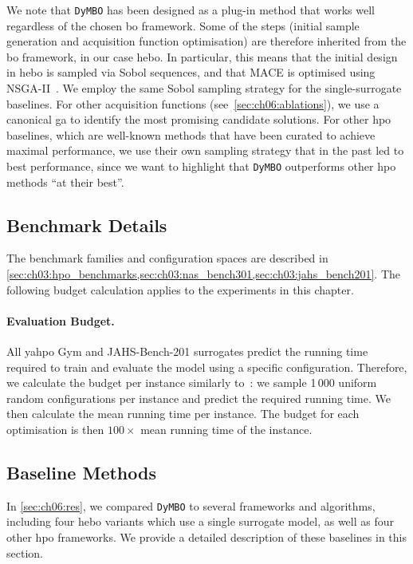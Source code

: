 We note that \texttt{DyMBO} has been designed as a plug-in method that works well regardless of the chosen \gls{bo} framework.
Some of the steps (initial sample generation and acquisition function optimisation) are therefore inherited from the \gls{bo} framework, in our case \gls{hebo}.
In particular, this means that the initial design in \gls{hebo} is sampled via Sobol sequences, and that MACE is optimised using NSGA-II~\citep{DebEtAl02}.
We employ the same Sobol sampling strategy for the single-surrogate baselines.
For other acquisition functions (see~\cref{sec:ch06:ablations}), we use a canonical \gls{ga} to identify the most promising candidate solutions.
For other \gls{hpo} baselines, which are well-known methods that have been curated to achieve maximal performance, we use their own sampling strategy that in the past led to best performance, since we want to highlight that \texttt{DyMBO} outperforms other \gls{hpo} methods ``at their best''.

\subsection{Benchmark Details}
\label{sec:ch06:benchs}

The benchmark families and configuration spaces are described in \cref{sec:ch03:hpo_benchmarks,sec:ch03:nas_bench301,sec:ch03:jahs_bench201}. The following budget calculation applies to the experiments in this chapter.

\paragraph{Evaluation Budget.}
All \gls{yahpo} Gym and JAHS-Bench-201 surrogates predict the running time required to train and evaluate the model using a specific configuration.
Therefore, we calculate the budget per instance similarly to~\citet{EggEtAl21}: we sample 1\,000 uniform random configurations per instance and predict the required running time.
We then calculate the mean running time per instance.
The budget for each optimisation is then $100\times $ mean running time of the instance.

\subsection{Baseline Methods}
\label{sec:ch06:baselines}

In \cref{sec:ch06:res}, we compared \texttt{DyMBO} to several frameworks and algorithms, including four \gls{hebo} variants which use a single surrogate model, as well as four other \gls{hpo} frameworks. We provide a detailed description of these baselines in this section.

